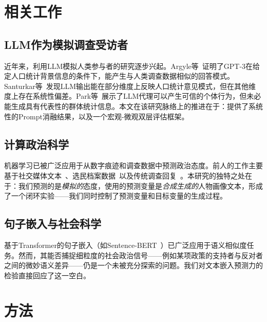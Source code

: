 \documentclass[11pt,a4paper]{ctexart}
\begin{document}
\section{相关工作}

\subsection{LLM作为模拟调查受访者}

近年来，利用LLM模拟人类参与者的研究逐步兴起。Argyle等~\cite{argyle2023out}证明了GPT-3在给定人口统计背景信息的条件下，能产生与人类调查数据相似的回答模式。Santurkar等~\cite{santurkar2023whose}发现LLM输出能在部分维度上反映人口统计意见模式，但在其他维度上存在系统性偏差。Park等~\cite{park2023generative}展示了LLM代理可以产生可信的个体行为，但未必能生成具有代表性的群体统计信息。本文在该研究脉络上的推进在于：提供了系统性的Prompt消融结果，以及一个宏观-微观双层评估框架。

\subsection{计算政治科学}

机器学习已被广泛应用于从数字痕迹和调查数据中预测政治态度。前人的工作主要基于社交媒体文本~\cite{barbera2015tweeting}、选民档案数据~\cite{hersh2015hacking}以及传统调查回复~\cite{montgomery2018predicting}。本研究的独特之处在于：我们预测的是\textit{模拟的}态度，使用的预测变量是\textit{合成生成的}人物画像文本，形成了一个闭环实验——我们同时控制了预测变量和目标变量的生成过程。

\subsection{句子嵌入与社会科学}

基于Transformer的句子嵌入（如Sentence-BERT~\cite{reimers2019sentence}）已广泛应用于语义相似度任务。然而，其能否捕捉细粒度的社会政治信号——例如某项政策的支持者与反对者之间的微妙语义差异——仍是一个未被充分探索的问题。我们对文本嵌入预测力的检验直接回应了这一空白。

\section{方法}
\end{document}
